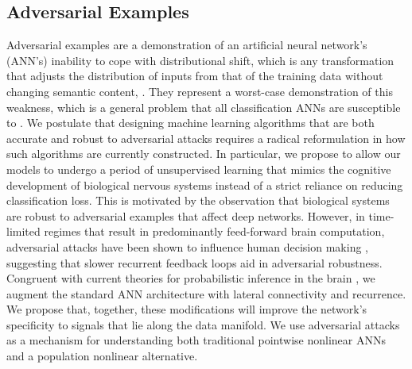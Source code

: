 \subsection{Adversarial Examples}
Adversarial examples are a demonstration of an artificial neural network's (ANN’s) inability to cope with distributional shift, which is any transformation that adjusts the distribution of inputs from that of the training data without changing semantic content, \parencite{ford2019adversarial}.
They represent a worst-case demonstration of this weakness, which is a general problem that all classification ANNs are susceptible to \parencite{hendrycks2018benchmarking}.
We postulate that designing machine learning algorithms that are both accurate and robust to adversarial attacks requires a radical reformulation in how such algorithms are currently constructed.
In particular, we propose to allow our models to undergo a period of unsupervised learning that mimics the cognitive development of biological nervous systems instead of a strict reliance on reducing classification loss.
This is motivated by the observation that biological systems are robust to adversarial examples that affect deep networks.
However, in time-limited regimes that result in predominantly feed-forward brain computation, adversarial attacks have been shown to influence human decision making \parencite{elsayed2018adversarial}, suggesting that slower recurrent feedback loops aid in adversarial robustness.
Congruent with current theories for probabilistic inference in the brain \parencite{lee2003hierarchical}, we augment the standard ANN architecture with lateral connectivity and recurrence.
We propose that, together, these modifications will improve the network’s specificity to signals that lie along the data manifold.
We use adversarial attacks as a mechanism for understanding both traditional pointwise nonlinear ANNs and a population nonlinear alternative.

